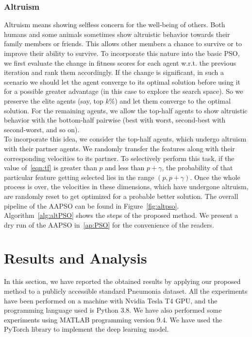 \documentclass[final,3p,times]{elsarticle}
\begin{document}
\subsubsection{Altruism}
Altruism means showing selfless concern for the well-being of others. Both humans {and} some animals sometimes show altruistic behavior towards their family members or {friends.} This {allows} other members a chance to survive or to improve their ability to survive. To incorporate this nature into the basic PSO, we first evaluate the change in fitness scores for each agent {w.r.t.} the previous iteration and rank them accordingly. If the change is significant, in such a {scenario} we should let the agent converge to its optimal solution before using it for a possible greater advantage (in this case to explore the search space). So we preserve the elite agents (say, top $k\%$) and let them converge to the optimal solution. For the remaining agents, we allow the top-half agents to show altruistic behavior with the bottom-half pairwise (best with worst, second-best with second-worst, and so on).\\
To incorporate this idea, we consider the top-half {agents,} which undergo altruism with their partner agents. We randomly transfer the features along with their corresponding velocities to its partner. To selectively perform this task, if the value of~\ref{eqn:tf} is greater than $p$ and less than $p+\gamma$, the probability of that particular feature getting selected lies in the range $(p,p+\gamma)$. Once the whole process is over, the velocities in these dimensions, which have {undergone altruism,} are randomly reset to get optimized for a probable better solution. The overall pipeline of the AAPSO can be found in Figure~\ref{fig:altpso}. Algorithm~\ref{alg:altPSO} shows the steps of the proposed method. {We present a} dry run of the AAPSO in~\ref{ap:PSO} for the convenience of the readers. 
\section{Results and Analysis}
\label{sec:results}
In this section, we have reported the obtained results by applying our proposed method to a publicly accessible standard Pneumonia dataset. All the experiments have been performed on a machine with Nvidia Tesla T4 GPU, and the programming language used is Python 3.8. We have also performed some experiments using MATLAB programming version 9.4. We have used the PyTorch library to implement the deep learning model.
\end{document}
